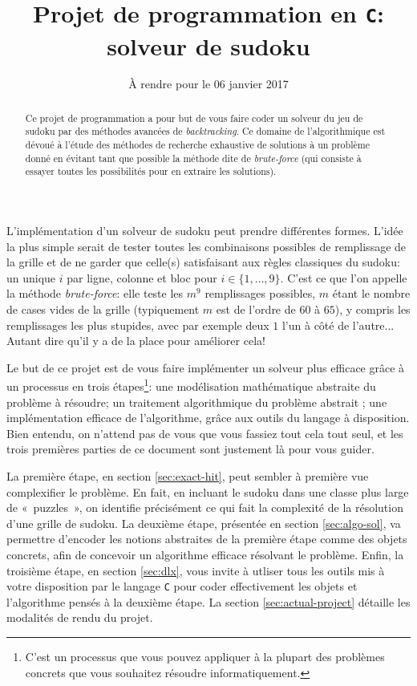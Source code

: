 \documentclass[french,a4paper]{article}
\title{Projet de programmation en {\tt C}:\\
  solveur de sudoku}
\date{\`A rendre pour le 06 janvier 2017}
\author{}
\theoremstyle{definition}
\theoremstyle{remark}
\begin{document}
\begin{abstract}
  Ce projet de programmation a pour but de vous faire coder un solveur
  du jeu de sudoku par des méthodes avancées de {\em backtracking}. Ce
  domaine de l'algorithmique est dévoué à l'étude des méthodes de
  recherche exhaustive de solutions à un problème donné en évitant
  tant que possible la méthode dite de {\em brute-force} (qui consiste
  à essayer toutes les possibilités pour en extraire les solutions).
\end{abstract}

\maketitle


L'implémentation d'un solveur de sudoku peut prendre différentes
formes. L'idée la plus simple serait de tester toutes les combinaisons
possibles de remplissage de la grille et de ne garder que celle(s)
satisfaisant aux règles classiques du sudoku: un unique $i$ par ligne,
colonne et bloc pour $i \in \{1,\dots,9\}$. C'est ce que l'on appelle
la méthode {\em brute-force}: elle teste les $m^9$ remplissages
possibles, $m$ étant le nombre de cases vides de la grille
(typiquement $m$ est de l'ordre de $60$ à $65$), y compris les
remplissages les plus stupides, avec par exemple deux $1$ l'un
à côté de l'autre... Autant dire qu'il y a de la place pour améliorer
cela!

Le but de ce projet est de vous faire implémenter un solveur plus
efficace grâce à un processus en trois étapes\footnote{C'est un
  processus que vous pouvez appliquer à la plupart des problèmes
  concrets que vous souhaitez résoudre informatiquement.}: une
modélisation mathématique abstraite du problème à résoudre; un
traitement algorithmique du problème abstrait ; une implémentation
efficace de l'algorithme, grâce aux outils du langage à
disposition. Bien entendu, on n'attend pas de vous que vous fassiez
tout cela tout seul, et les trois premières parties de ce document
sont justement là pour vous guider.

La première étape, en section \ref{sec:exact-hit}, peut sembler à
première vue complexifier le problème. En fait, en incluant le sudoku
dans une classe plus large de «~puzzles~», on identifie précisément ce
qui fait la complexité de la résolution d'une grille de sudoku. La
deuxième étape, présentée en section \ref{sec:algo-sol}, va permettre
d'encoder les notions abstraites de la première étape comme des objets
concrets, afin de concevoir un algorithme efficace résolvant le
problème. Enfin, la troisième étape, en section \ref{sec:dlx}, vous
invite à utliser tous les outils mis à votre disposition par le
langage {\tt C} pour coder effectivement les objets et l'algorithme
pensés à la deuxième étape. La section \ref{sec:actual-project}
détaille les modalités de rendu du projet.
\end{document}
